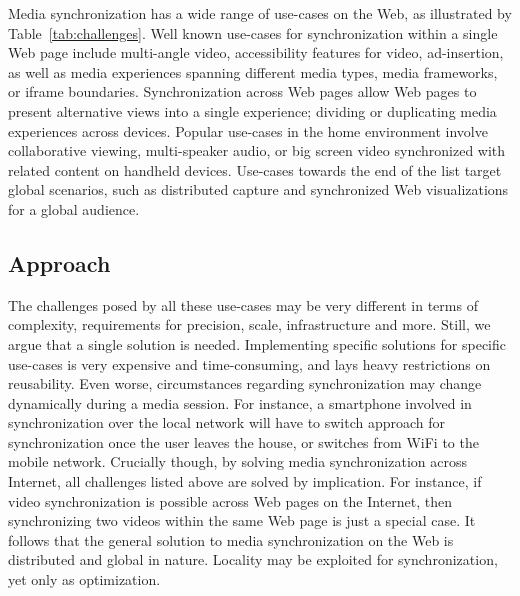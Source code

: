 Media synchronization has a wide range of use-cases on the Web, as illustrated
by Table~\ref{tab:challenges}. Well known use-cases for synchronization within
a single Web page include multi-angle video, accessibility features for video,
ad-insertion, as well as media experiences spanning different media types,
media frameworks, or iframe boundaries. Synchronization across Web pages allow
Web pages to present alternative views into a single experience; dividing or
duplicating media experiences across devices. Popular use-cases in the home
environment involve collaborative viewing, multi-speaker audio, or big screen
video synchronized with related content on handheld devices. Use-cases towards
the end of the list target global scenarios, such as distributed capture and
synchronized Web visualizations for a global audience.

\subsection{Approach}

The challenges posed by all these use-cases may be very different in terms of
complexity, requirements for precision, scale, infrastructure and more. Still,
we argue that a single solution is needed. Implementing specific solutions for
specific use-cases is very expensive and time-consuming, and lays heavy
restrictions on reusability. Even worse, circumstances regarding
synchronization may change dynamically during a media session. For instance, a
smartphone involved in synchronization over the local network will have to
switch approach for synchronization once the user leaves the house, or
switches from WiFi to the mobile network. Crucially though, by solving media
synchronization across Internet, all challenges listed above are solved by
implication. For instance, if video synchronization is possible across Web
pages on the Internet, then synchronizing two videos within the same Web page
is just a special case. It follows that the general solution to media
synchronization on the Web is distributed and global in nature. Locality may
be exploited for synchronization, yet only as optimization.
